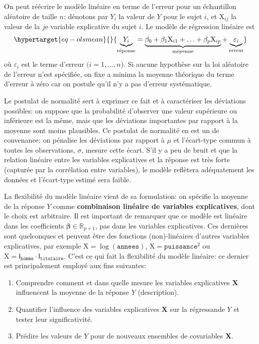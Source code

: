 \documentclass[
  11pt,
  letterpaper,
]{scrbook}
\providecommand{\tightlist}{%
  \setlength{\itemsep}{0pt}\setlength{\parskip}{0pt}}\usepackage{longtable,booktabs,array}
\theoremstyle{definition}
\theoremstyle{remark}
\begin{document}
On peut réécrire le modèle linéaire en terme de l'erreur pour un
échantillon aléatoire de taille \(n\): dénotons par \(Y_i\) la valeur de
\(Y\) pour le sujet \(i\), et \(\mathrm{X}_{ij}\) la valeur de la \(j\)e
variable explicative du sujet \(i\). Le modèle de régression linéaire
est \begin{equation}\protect\hypertarget{eq-olsmean}{}{
\underbrace{Y_i}_{\text{réponse}} = \underbrace{\beta_0 + \beta_1 \mathrm{X}_{i1} + \ldots + \beta_p \mathrm{X}_{ip}}_{\text{moyenne}} + \underbrace{\varepsilon_{i}}_{\text{erreur}}
}\label{eq-olsmean}\end{equation} où \(\varepsilon_i\) est le terme
d'erreur \((i=1, \ldots, n\)). Si aucune hypothèse sur la loi aléatoire
de l'erreur n'est spécifiée, on fixe a minima la moyenne théorique du
terme d'erreur à zéro car on postule qu'il n'y a pas d'erreur
systématique.

Le postulat de normalité sert à exprimer ce fait et à caractériser les
déviations possibles: on suppose que la probabilité d'observer une
valeur supérieure ou inférieure est la même, mais que les déviations
importantes par rapport à la moyenne sont moins plausibles. Ce postulat
de normalité en est un de convenance: on pénalise les déviations par
rapport à \(\mu\) et l'écart-type commun à toutes les observations,
\(\sigma\), mesure cette écart. S'il y a peu de bruit et que la relation
linéaire entre les variables explicatives et la réponse est très forte
(capturée par la corrélation entre variables), le modèle reflètera
adéquatement les données et l'écart-type estimé sera faible.

La flexibilité du modèle linéaire vient de sa formulation: on spécifie
la moyenne de la réponse \(Y\) comme \textbf{combinaison linéaire de
variables explicatives}, dont le choix est arbitraire. Il est important
de remarquer que ce modèle est linéaire dans les coefficients
\(\boldsymbol{\beta}\in \mathbb{R}_{p+1}\), pas dans les variables
explicatives. Ces dernières sont quelconques et peuvent être des
fonctions (non)-linéaires d'autres variables explicatives, par exemple
\(\mathrm{X}=\log(\texttt{annees})\),
\(\mathrm{X}=\texttt{puissance}^2\) ou
\(\mathrm{X}= \mathsf{I}_{\texttt{homme}}\cdot\mathsf{I}_{\texttt{titulaire}}\).
C'est ce qui fait la flexibilité du modèle linéaire: ce dernier est
principalement employé aux fins suivantes:

\begin{enumerate}
\def\labelenumi{\arabic{enumi}.}
\tightlist
\item
  Comprendre comment et dans quelle mesure les variables explicatives
  \(\mathbf{X}\) influencent la moyenne de la réponse \(Y\)
  (description).
\item
  Quantifier l'influence des variables explicatives \(\mathbf{X}\) sur
  la régressande \(Y\) et tester leur significativité.
\item
  Prédire les valeurs de \(Y\) pour de nouveaux ensembles de covariables
  \(\mathbf{X}\).
\end{enumerate}
\end{document}
